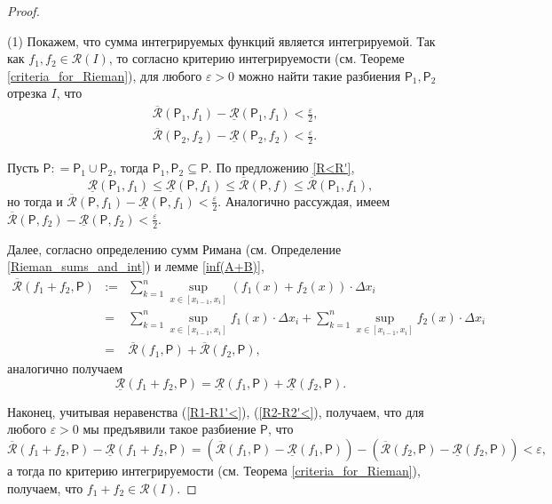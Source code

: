 \begin{proof}~

(1) Покажем, что сумма интегрируемых функций является интегрируемой. Так как $f_1,f_2 \in \mathscr{R}(I)$, то согласно критерию интегрируемости (см. Теореме \ref{criteria_for_Rieman}), для любого $\varepsilon>0$ можно найти такие разбиения $\mathsf{P}_1, \mathsf{P}_2$ отрезка $I$, что
\begin{align}
    & \overline{\mathcal{R}}(\mathsf{P}_1,f_1) - \underline{\mathcal{R}}(\mathsf{P}_1,f_1) < \frac{\varepsilon}{2}, \label{R1-R1'<}\\
    & \overline{\mathcal{R}}(\mathsf{P}_2,f_2) - \underline{\mathcal{R}}(\mathsf{P}_2,f_2) < \frac{\varepsilon}{2}. \label{R2-R2'<}
\end{align}

Пусть $\mathsf{P}: = \mathsf{P}_1 \cup \mathsf{P}_2$, тогда $\mathsf{P}_1,\mathsf{P}_2 \subseteq \mathsf{P}$. По предложению \ref{R<R'},
\[
 \underline{\mathcal{R}}(\mathsf{P}_1,f_1) \le \underline{\mathcal{R}}(\mathsf{P},f_1) \le \overline{\mathcal{R}}(\mathsf{P},f) \le \overline{\mathcal{R}}(\mathsf{P}_1,f_1),
\]
но тогда и $\overline{\mathcal{R}}(\mathsf{P},f_1) - \underline{\mathcal{R}}(\mathsf{P},f_1) < \frac{\varepsilon}{2}$. Аналогично рассуждая, имеем $\overline{\mathcal{R}}(\mathsf{P},f_2) - \underline{\mathcal{R}}(\mathsf{P},f_2) < \frac{\varepsilon}{2}$.


Далее, согласно определению сумм Римана (см. Определение \ref{Rieman_sums_and_int}) и лемме \ref{inf(A+B)}, 
\begin{eqnarray*}
    \overline{\mathcal{R}}(f_1+f_2, \mathsf{P}) &:=& \sum_{k=1}^n \sup_{x \in [x_{i-1}, x_i]} (f_1(x) + f_2(x)) \cdot \Delta x_i \\
    &=& \sum_{k=1}^n \sup_{x \in [x_{i-1}, x_i]} f_1(x)  \cdot \Delta x_i + \sum_{k=1}^n \sup_{x \in [x_{i-1}, x_i]} f_2(x)  \cdot \Delta x_i \\
    &=& \overline{\mathcal{R}}(f_1, \mathsf{P}) + \overline{\mathcal{R}}(f_2, \mathsf{P}),
\end{eqnarray*}
аналогично получаем
\[
  \underline{\mathcal{R}}(f_1+f_2, \mathsf{P}) =  \underline{\mathcal{R}}(f_1, \mathsf{P}) +\underline{\mathcal{R}}(f_2, \mathsf{P}).
\]

Наконец, учитывая неравенства (\ref{R1-R1'<}), (\ref{R2-R2'<}), получаем, что для любого $\varepsilon>0$ мы предъявили такое разбиение $\mathsf{P}$, что
\[
 \overline{\mathcal{R}}(f_1+f_2, \mathsf{P}) - \underline{\mathcal{R}}(f_1+f_2, \mathsf{P}) = \left( \overline{\mathcal{R}}(f_1, \mathsf{P}) - \underline{\mathcal{R}}(f_1, \mathsf{P}) \right) - \left( \overline{\mathcal{R}}(f_2, \mathsf{P}) - \underline{\mathcal{R}}(f_2, \mathsf{P}) \right) < \varepsilon,
\]
а тогда по критерию интегрируемости (см. Теорема \ref{criteria_for_Rieman}), получаем, что $f_1+f_2 \in \mathscr{R}(I).$


\end{proof}
